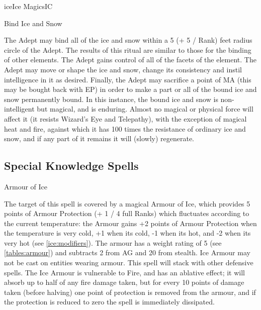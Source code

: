 \begin{college}[1.5]{ice}{Ice Magics}{IC}
\begin{ritual}[Q-2]{Bind Ice and Snow}

\begin{effects}
The Adept may bind all of the ice and snow within a 5 (+ 5 / Rank)
feet radius circle of the Adept. The results of this ritual are
similar to those for the binding of other elements.  The Adept gains
control of all of the facets of the element.  The Adept may move or
shape the ice and snow, change its consistency and instil intelligence
in it as desired.  Finally, the Adept may sacrifice a point of MA
(this may be bought back with EP) in order to make a part or all of
the bound ice and snow permanently bound.  In this instance, the bound
ice and snow is non-intelligent but magical, and is enduring.  Almost
no magical or physical force will affect it (\eg it resists Wizard's
Eye and Telepathy), with the exception of magical heat and fire,
against which it has 100 times the resistance of ordinary ice and
snow, and if any part of it remains it will (slowly) regenerate.
\end{effects}
\end{ritual}

\subsection{Special Knowledge Spells}

\begin{spell}[S-1]{Armour of Ice}

\begin{effects}
The target of this spell is covered by a magical Armour of Ice, which
provides 5 points of Armour Protection (+ 1 / 4 full Ranks) which
fluctuates according to the current temperature: the Armour gains +2
points of Armour Protection when the temperature is very cold, +1 when
its cold, -1 when its hot, and -2 when its very hot (see
\ref{ice:modifiers}).  The armour has a weight rating of 5 (see
\ref{tables:armour}) and subtracts 2 from AG and 20 from stealth.  Ice
Armour may not be cast on entities wearing armour.  This spell will
stack with other defensive spells.  The Ice Armour is vulnerable to
Fire, and has an ablative effect; it will absorb up to half of any
fire damage taken, but for every 10 points of damage taken (before
halving) one point of protection is removed from the armour, and if
the protection is reduced to zero the spell is immediately dissipated.
\end{effects}
\end{spell}


\end{college}
